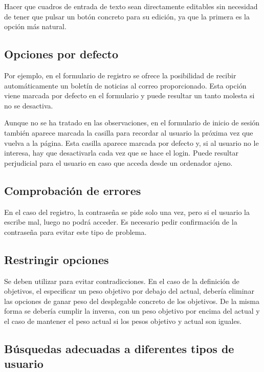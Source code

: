 \documentclass[a4paper]{article}
\begin{document}
	Hacer que cuadros de entrada de texto sean directamente editables sin necesidad de tener que pulsar un botón concreto para su edición, ya que la primera es la opción más natural.
	
	\subsection{Opciones por defecto}
	
	Por ejemplo, en el formulario de registro se ofrece la posibilidad de recibir automáticamente un boletín de noticias al correo proporcionado. Esta opción viene marcada por defecto en el formulario y puede resultar un tanto molesta si no se desactiva.
	
	Aunque no se ha tratado en las observaciones, en el formulario de inicio de sesión también aparece marcada la casilla para recordar al usuario la próxima vez que vuelva a la página. Esta casilla aparece marcada por defecto y, si al usuario no le interesa, hay que desactivarla cada vez que se hace el login. Puede resultar perjudicial para el usuario en caso que acceda desde un ordenador ajeno.
	
	\subsection{Comprobación de errores}
	
	En el caso del registro, la contraseña se pide solo una vez, pero si el usuario la escribe mal, luego no podrá acceder. Es necesario pedir confirmación de la contraseña para evitar este tipo de problema.
	
	\subsection{Restringir opciones}
	
	Se deben utilizar para evitar contradicciones. En el caso de la definición de objetivos, el especificar un peso objetivo por debajo del actual, debería eliminar las opciones de ganar peso del desplegable concreto de los objetivos. De la misma forma se debería cumplir la inversa, con un peso objetivo por encima del actual y el caso de mantener el peso actual si los pesos objetivo y actual son iguales.
	
	\subsection{Búsquedas adecuadas a diferentes tipos de usuario}
	
\end{document}
